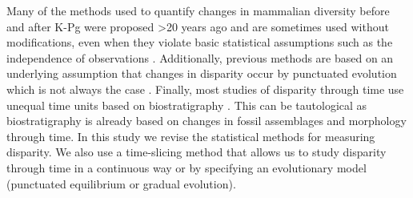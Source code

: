\documentclass[12pt,letterpaper]{article}
\begin{document}
\begin{enumerate}
    Many of the methods used to quantify changes in mammalian diversity before and after K-Pg were proposed \textgreater 20 years ago \citep{Foote01071994,Wills1994} and are sometimes used without modifications, even when they violate basic statistical assumptions such as the independence of observations
    \citep[e.g.,][]{brusatte50,Brusatte12092008,cisneros2010,thorneresetting2011,prentice2011,brusattedinosaur2012,toljagictriassic-jurassic2013,ruta2013,bentonmodels2014,bensonfaunal2014}.
    Additionally, previous methods are based on an underlying assumption that changes in disparity occur by punctuated evolution \citep[e.g.][]{Wesley-Hunt2005} which is not always the case \citep{Hunt21042015}.
    Finally, most studies of disparity through time use unequal time units based on biostratigraphy \citep{Brusatte12092008,brusattedinosaur2012,toljagictriassic-jurassic2013}. 
    This can be tautological as biostratigraphy is already based on changes in fossil assemblages and morphology through time.
    In this study we revise the statistical methods for measuring disparity.
    We also use a time-slicing method that allows us to study disparity through time in a continuous way or by specifying an evolutionary model (punctuated equilibrium or gradual evolution).
  \end{enumerate}
\end{document}
